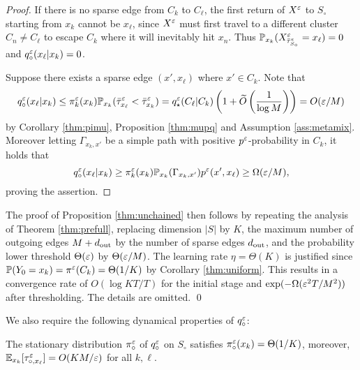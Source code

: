 \begin{proof}
If there is no sparse edge from $C_k$ to $C_\ell$, the first return of $X^\varepsilon$ to $S_\circ$ starting from $x_k$ cannot be $x_\ell$, since $X^\varepsilon$ must first travel to a different cluster $C_n\ne C_\ell$ to escape $C_k$ where it will inevitably hit $x_n$. Thus $\mathbb{P}_{x_k}(X_{\bar{\tau}_{S_\circ}^\varepsilon}^\varepsilon =x_\ell)=0$ and $q_\circ^\varepsilon(x_\ell|x_k) = 0$.

Suppose there exists a sparse edge $(x',x_\ell)$ where $x'\in C_k$. Note that
\begin{equation*}
q_\circ^\varepsilon(x_\ell|x_k) \le \pi_k^\varepsilon(x_k) \mathbb{P}_{x_k}(\bar{\tau}_{x_\ell}^\varepsilon <\bar{\tau}_{x_k}^\varepsilon) = q_\star^\varepsilon(C_\ell|C_k)\left(1+ \widetilde{O}\left(\frac{1}{\log M}\right)\right) = O(\varepsilon/M)
\end{equation*}
by Corollary \ref{thm:pimu}, Proposition \ref{thm:mupq} and Assumption \ref{ass:metamix}. Moreover letting $\Gamma_{x_k,x'}$ be a simple path with positive $p^\varepsilon$-probability in $C_k$, it holds that
\begin{equation*}
q_\circ^\varepsilon(x_\ell|x_k) \ge \pi_k^\varepsilon(x_k) \mathbb{P}_{x_k}(\Gamma_{x_k,x'}) p^\varepsilon(x',x_\ell) \ge \Omega(\varepsilon/M),
\end{equation*}
proving the assertion.
\end{proof}


The proof of Proposition \ref{thm:unchained} then follows by repeating the analysis of Theorem \ref{thm:prefull}, replacing dimension $|S|$ by $K$, the maximum number of outgoing edges $M+d_{\operatorname{out}}$ by the number of sparse edges $d_{\operatorname{out}}$, and the probability lower threshold $\Theta(\varepsilon)$ by $\Theta(\varepsilon/M)$. The learning rate $\eta=\Theta(K)$ is justified since $\mathbb{P}(Y_0=x_k) = \pi^\varepsilon(C_k) = \Theta(1/K)$ by Corollary \ref{thm:uniform}. This results in a convergence rate of $O(\log KT/T)$ for the initial stage and $\exp(-\Omega(\varepsilon^2 T/M^2))$ after thresholding. The details are omitted. \qed

We also require the following dynamical properties of $q_\circ^\varepsilon$:

\begin{lemma}\label{thm:matcha}
The stationary distribution $\pi_\circ^\varepsilon$ of $q_\circ^\varepsilon$ on $S_\circ$ satisfies $\pi_\circ^\varepsilon(x_k) = \Theta(1/K)$, moreover, $\mathbb{E}_{x_k}[\tau_{\circ,x_\ell}^\varepsilon] =O(KM/\varepsilon)$ for all $k,\ell$.
\end{lemma}

